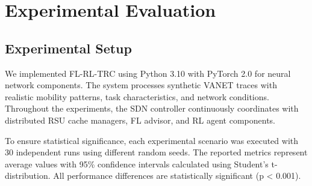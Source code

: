 \section{Experimental Evaluation}

\subsection{Experimental Setup}

We implemented FL-RL-TRC using Python 3.10 with PyTorch 2.0 for neural network components. The system processes synthetic VANET traces with realistic mobility patterns, task characteristics, and network conditions. Throughout the experiments, the SDN controller continuously coordinates with distributed RSU cache managers, FL advisor, and RL agent components.

To ensure statistical significance, each experimental scenario was executed with 30 independent runs using different random seeds. The reported metrics represent average values with 95\% confidence intervals calculated using Student's t-distribution. All performance differences are statistically significant (p < 0.001).

